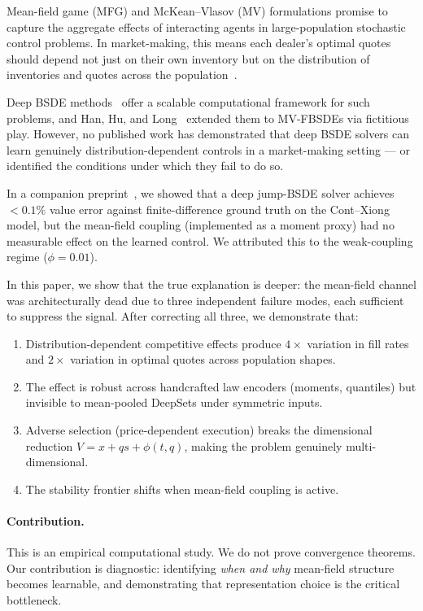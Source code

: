 \documentclass[11pt,a4paper]{article}
\begin{document}
Mean-field game (MFG) and McKean--Vlasov (MV) formulations promise to capture the aggregate effects of interacting agents in large-population stochastic control problems. In market-making, this means each dealer's optimal quotes should depend not just on their own inventory but on the distribution of inventories and quotes across the population~\cite{cont2024dynamics, carmona2018probabilistic}.

Deep BSDE methods~\cite{han2018solving, e2017deep} offer a scalable computational framework for such problems, and Han, Hu, and Long~\cite{han2022learning} extended them to MV-FBSDEs via fictitious play. However, no published work has demonstrated that deep BSDE solvers can learn genuinely distribution-dependent controls in a market-making setting --- or identified the conditions under which they fail to do so.

In a companion preprint~\cite{garry2026preprint1}, we showed that a deep jump-BSDE solver achieves $<0.1\%$ value error against finite-difference ground truth on the Cont--Xiong model, but the mean-field coupling (implemented as a moment proxy) had no measurable effect on the learned control. We attributed this to the weak-coupling regime ($\phi = 0.01$).

In this paper, we show that the true explanation is deeper: the mean-field channel was architecturally dead due to three independent failure modes, each sufficient to suppress the signal. After correcting all three, we demonstrate that:
\begin{enumerate}
  \item Distribution-dependent competitive effects produce $4\times$ variation in fill rates and $2\times$ variation in optimal quotes across population shapes.
  \item The effect is robust across handcrafted law encoders (moments, quantiles) but invisible to mean-pooled DeepSets under symmetric inputs.
  \item Adverse selection (price-dependent execution) breaks the dimensional reduction $V = x + qs + \phi(t,q)$, making the problem genuinely multi-dimensional.
  \item The stability frontier shifts when mean-field coupling is active.
\end{enumerate}

\paragraph{Contribution.} This is an empirical computational study. We do not prove convergence theorems. Our contribution is diagnostic: identifying \emph{when and why} mean-field structure becomes learnable, and demonstrating that representation choice is the critical bottleneck.
\end{document}
